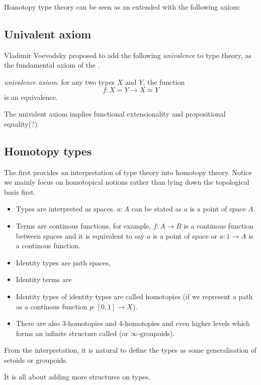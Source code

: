 Homotopy type theory can be seen as an \itt extended with the
following axiom:

\subsection{Univalent axiom}

Vladimir Voevodsky proposed to add the following \emph{univalence} to
type theory, as the fundamental axiom of the \hott.
 
\begin{definition}
\emph{univalence axiom}. for any two types $X$ and $Y$, the function 
$$f : X = Y \rightarrow X \simeq Y$$ is an equivalence.
\end{definition}


The univalent axiom implies functional extensionality and
propositional equality(?).

\subsection{Homotopy types}

The \hott first provides an interpretation of type theory into
homotopy theory. Notice we mainly focus on homotopical notions rather
than lying down the topological basis first.

\begin{itemize}
\item Types are interpreted as spaces. $a : A$ can be stated as $a$ is
  a point of space $A$.
\item Terms are continous functions, for example, $f : A \rightarrow B$ is a
  continous function between spaces and it is equivalent to say $a$ is
  a point of space or $a : 1 \rightarrow A$ is a continous function.
\item Identity types are path spaces, 
\item Identity terms are 
\item Identity types of identity types are called homotopies (if we
  represent a path as a continous function $p : [0,1] \rightarrow X$).
\item There are also 3-homotopies and 4-homotopies and even higher
  levels which forms an infinite structure called  \og (or $\infty$-groupoids).
\end{itemize}

From the interpretation, it is natural to define the types as some
generalisation of setoids or groupoids.

It is all about adding more structures on types. 

